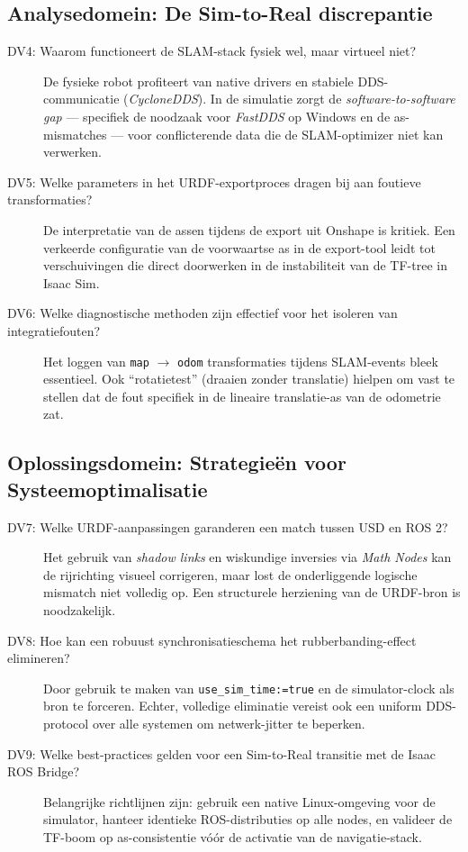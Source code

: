 \subsection{Analysedomein: De Sim-to-Real discrepantie}
\begin{description}
    \item[DV4: Waarom functioneert de SLAM-stack fysiek wel, maar virtueel niet?] De fysieke robot profiteert van native drivers en stabiele DDS-communicatie (\textit{CycloneDDS}). In de simulatie zorgt de \textit{software-to-software gap} — specifiek de noodzaak voor \textit{FastDDS} op Windows en de as-mismatches — voor conflicterende data die de SLAM-optimizer niet kan verwerken.
    
    \item[DV5: Welke parameters in het URDF-exportproces dragen bij aan foutieve transformaties?] De interpretatie van de assen tijdens de export uit Onshape is kritiek. Een verkeerde configuratie van de voorwaartse as in de export-tool leidt tot verschuivingen die direct doorwerken in de instabiliteit van de TF-tree in Isaac Sim.
    
    \item[DV6: Welke diagnostische methoden zijn effectief voor het isoleren van integratiefouten?] Het loggen van \texttt{map} $\to$ \texttt{odom} transformaties tijdens SLAM-events bleek essentieel. Ook ``rotatietest'' (draaien zonder translatie) hielpen om vast te stellen dat de fout specifiek in de lineaire translatie-as van de odometrie zat.
\end{description}

\subsection{Oplossingsdomein: Strategieën voor Systeemoptimalisatie}
\begin{description}
    \item[DV7: Welke URDF-aanpassingen garanderen een match tussen USD en ROS 2?] Het gebruik van \textit{shadow links} en wiskundige inversies via \textit{Math Nodes} kan de rijrichting visueel corrigeren, maar lost de onderliggende logische mismatch niet volledig op. Een structurele herziening van de URDF-bron is noodzakelijk.
    
    \item[DV8: Hoe kan een robuust synchronisatieschema het rubberbanding-effect elimineren?] Door gebruik te maken van \texttt{use\_sim\_time:=true} en de simulator-clock als bron te forceren. Echter, volledige eliminatie vereist ook een uniform DDS-protocol over alle systemen om netwerk-jitter te beperken.
    
    \item[DV9: Welke best-practices gelden voor een Sim-to-Real transitie met de Isaac ROS Bridge?] Belangrijke richtlijnen zijn: gebruik een native Linux-omgeving voor de simulator, hanteer identieke ROS-distributies op alle nodes, en valideer de TF-boom op as-consistentie vóór de activatie van de navigatie-stack.
\end{description}

